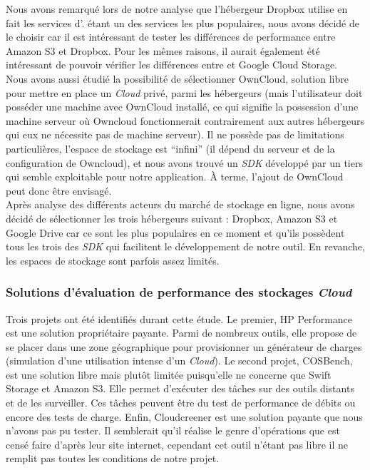 \documentclass[10pt]{article}
\begin{document}
Nous avons remarqué lors de notre analyse que l’hébergeur Dropbox utilise en
fait les services d'\cite{S3}. \cite{Dropbox} étant un des services les plus
populaires, nous avons décidé de le choisir car il est intéressant de
tester les différences de performance entre Amazon S3 et Dropbox. Pour les
mêmes raisons, il aurait également été intéressant de pouvoir vérifier les
différences entre \cite{GoogleDrive} et Google Cloud Storage.\\

Nous avons aussi étudié la possibilité de sélectionner OwnCloud, solution libre
pour mettre en place un \textit{Cloud} privé, parmi les hébergeurs (mais
l’utilisateur doit posséder une machine avec OwnCloud installé, ce qui signifie
la possession d'une machine serveur où Owncloud fonctionnerait contrairement
aux autres hébergeurs qui eux ne nécessite pas de machine serveur). Il ne
possède pas de limitations particulières, l’espace de stockage est “infini” (il
dépend du serveur et de la configuration de Owncloud), et nous avons trouvé un
\textit{SDK} développé par un tiers qui semble exploitable pour notre
application. À terme, l’ajout de OwnCloud peut donc être envisagé.\\ Après
analyse des différents acteurs du marché de stockage en ligne, nous avons
décidé de sélectionner les trois hébergeurs suivant : Dropbox, Amazon S3 et
Google Drive car ce sont les plus populaires en ce moment et qu'ils possèdent
tous les trois des \textit{SDK} qui facilitent le développement de notre outil.
En revanche, les espaces de stockage sont parfois assez limités.

\subsubsection{Solutions d'évaluation de performance des stockages
\textit{Cloud}}

Trois projets ont été identifiés durant cette étude. Le premier, HP
Performance est une solution propriétaire payante. Parmi de nombreux outils,
elle propose de se placer dans une zone géographique pour provisionner un
générateur de charges (simulation d'une utilisation intense d'un \textit{Cloud}). Le
second projet, COSBench, est une solution libre mais plutôt limitée puisqu’elle
ne concerne que Swift Storage et Amazon S3. Elle permet d'exécuter des tâches
sur des outils distants et de les surveiller. Ces tâches peuvent être du test
de performance de débits ou encore des tests de charge. Enfin, Cloudcreener est
une solution payante que nous n’avons pas pu tester. Il semblerait qu'il
réalise le genre d'opérations que \KYD est censé faire d'après leur site
internet, cependant cet outil n'étant pas libre il ne remplit pas toutes les
conditions de notre projet.\\
\end{document}
